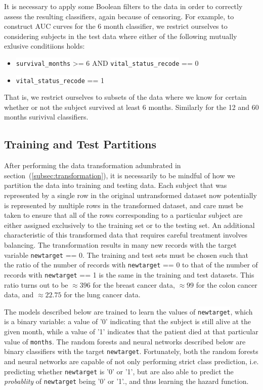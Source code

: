\documentclass[a4paper,11pt]{article}
\newcommand{\codewhite}[1]{\colorbox{white}{\texttt{#1}}}
\begin{document}
It is necessary to apply some Boolean filters to the data in order to correctly assess the resulting classifiers, again because of censoring. For example, to construct AUC curves for the 6 month classifier, we restrict ourselves to considering
subjects in the test data where either of the following mutually exlusive conditiions holds:

\begin{itemize}[noitemsep]
\item \codewhite{survival\_months} >= 6 AND \codewhite{vital\_status\_recode} == 0
\item \codewhite{vital\_status\_recode} == 1
\end{itemize}

That is, we restrict ourselves to subsets of the data where we know for certain whether or not the subject survived at least 6 months. Similarly for the 12 and 60 months surivival classifiers. 


\subsection{Training and Test Partitions}
\label{subsec:traintest}

After performing the data transformation adumbrated in section~(\ref{subsec:transformation}), it is necessarily to be mindful of how we partition the data into training and testing data. Each subject that was represented by a single row in the original untransformed dataset now potentially is represented by multiple rows in the transformed dataset, and care must be taken to ensure that all of the rows corresponding to a particular subject are either assigned exclusively to the training set or to the testing set. 
An additional characteristic of this transformed data that requires careful treatment involves balancing. The transformation results in many new records with the target variable \codewhite{newtarget} == 0. The training and test sets must be chosen such that the ratio of the number of records with \codewhite{newtarget} == 0 to that of the number of records with \codewhite{newtarget} == 1 is the same in the training and test datasets.
This ratio turns out to be $\approx 396$ for the breast cancer data, $\approx  99$ for the colon cancer data, and 
$\approx 22.75$ for the lung cancer data. 


 
The models described below are trained to learn the values of \codewhite{newtarget}, which is a binary variable: a value of '0' indicating that the subject is still alive at the given month, while a value of '1' indicates that the patient died at that particular value of \codewhite{months}. The random forests and neural networks described below are binary classifiers with the target \codewhite{newtarget}. Fortunately, both the random forests and neural networks are capable of not only performing strict class prediction, i.e. predicting whether \codewhite{newtarget} is '0' or '1', but are also able to predict the \textit{probablity} of \codewhite{newtarget} being '0' or '1'., and thus learning the hazard function.
\end{document}
